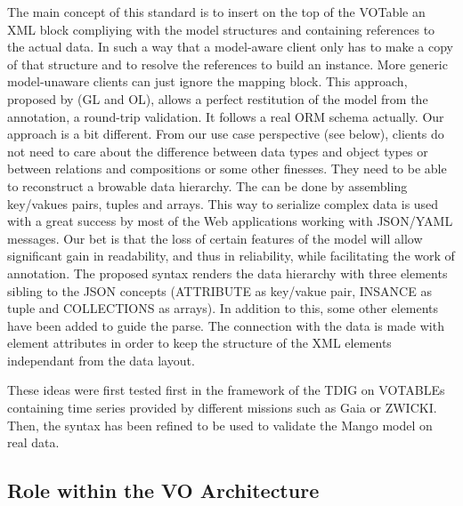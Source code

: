 \documentclass[11pt,a4paper]{ivoa}
\begin{document}
The main concept of this standard is to insert on the  top of the VOTable an XML block compliying with the model structures and containing references to the actual data.
In such a way that a model-aware client only has to make a copy of that structure and to resolve the references  to build an instance. More generic model-unaware clients can just ignore the mapping block. 
This approach, proposed by (GL and OL), allows a perfect restitution of the model from the annotation, a round-trip validation. It follows a real ORM schema actually.
Our approach is a bit different. From our use case perspective (see below), clients do not need  to care about the difference between data types and object types or between relations and compositions or some other finesses. They need to be able to reconstruct a browable data hierarchy. The can be done by assembling key/vakues pairs, tuples and arrays. This way to serialize complex data is used with a great success by most of the Web applications working with JSON/YAML messages. 
Our bet is that the loss of certain features of the model will allow significant gain in readability, and thus in reliability, while facilitating the work of annotation. 
The proposed syntax renders the data hierarchy with three elements sibling to the JSON concepts (ATTRIBUTE as key/vakue pair, INSANCE as tuple and COLLECTIONS as arrays). In addition to this, some other elements have been added to guide the parse. 
The connection with the data is made with element attributes in order to keep the structure of the XML elements independant from the data layout.

These ideas were first tested first in the framework of the TDIG on VOTABLEs containing time series provided by different missions such as Gaia or ZWICKI. 
Then, the syntax has been refined to be used to validate the Mango model on real data.


\lstset{language=XML}

\subsection{Role within the VO Architecture}
\end{document}
